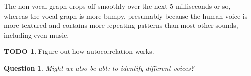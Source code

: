 \documentclass[12pt]{article}
\theoremstyle{plain}
\newtheorem{question}[theorem]{Question}
\theoremstyle{definition}
\newtheorem*{todo}{TODO}
\theoremstyle{remark}
\begin{document}
The non-vocal graph drops off smoothly over the next 5 milliseconds or so, whereas the vocal graph is more bumpy, presumably because the human voice is more textured and contains more repeating patterns than most other sounds, including even music.

\begin{todo}
Figure out how autocorrelation works.
\end{todo}

\begin{question}
Might we also be able to identify different voices?
\end{question}
\end{document}
